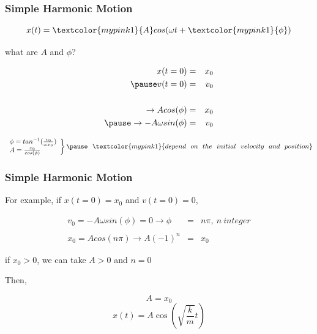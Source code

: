 \documentclass[]{beamer}
\begin{document}
\begin{frame}
\frametitle{Simple Harmonic Motion}

\begin{equation*}
  x(t)= \textcolor{mypink1}{A}cos(\omega t+ \textcolor{mypink1}{\phi})
\end{equation*}

\pause

 \textcolor{mypink1}{what are $A$ and $\phi$?}


\pause
\begin{eqnarray*}
x(t=0)&=&x_0\\
\pause
v(t=0)&=&v_0\\
\\
\rightarrow Acos(\phi)&=&x_0\\
\pause
\rightarrow -A\omega sin(\phi)&=&v_0
\end{eqnarray*}
\pause



\begin{equation*}
 \left.
  \begin{array}{ll}
   \phi=tan^{-1}(\frac{v_0}{\omega x_0})\\
   A=\frac{x_0}{cos(\phi)}\\
  \end{array}
  \right\rbrace \pause~~ \textcolor{mypink1}{depend~~ on ~~the ~~initial~~ velocity ~~and ~~position}
  \end{equation*}


  \end{frame}






\begin{frame}
\frametitle{Simple Harmonic Motion}

For example, if $x(t=0)=x_0$ and $v(t=0)=0$,

\pause

\begin{eqnarray*}
v_0=-A\omega sin(\phi)=0\rightarrow \phi&=&n\pi,~n~integer\\
\\
 x_0=Acos(n\pi) \rightarrow A (-1)^n&=&x_0
\end{eqnarray*}

\pause

if $x_0>0$,  we can take $A>0$ and  $n=0$

\vspace{3mm}
\pause
Then,

\begin{equation*}
A=x_0
\end{equation*}
\pause
\begin{equation*}
\boxed{x(t)=A\cos\left(\sqrt{\frac{k}{m}}t\right)}
\end{equation*}


  \end{frame}
\end{document}
